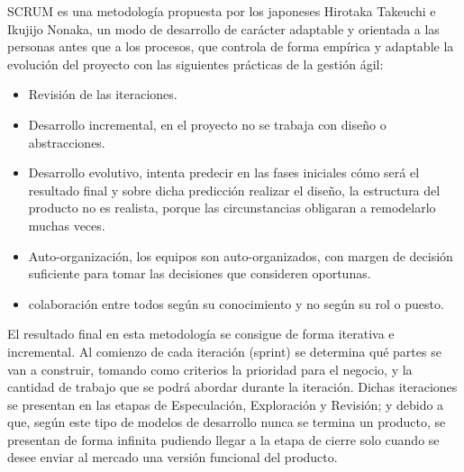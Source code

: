 SCRUM es una metodología propuesta por los japoneses Hirotaka Takeuchi e Ikujijo Nonaka, un modo de desarrollo de carácter adaptable y orientada a las personas antes
que a los procesos, que controla de forma empírica y adaptable la evolución del proyecto con las siguientes prácticas de la gestión ágil:

\begin{itemize}
 \item Revisión de las iteraciones.
 \item Desarrollo incremental, en el proyecto no se trabaja con diseño o abstracciones.
 \item Desarrollo evolutivo, intenta predecir en las fases iniciales cómo será el resultado final y sobre dicha predicción realizar el diseño, la estructura del producto no es realista, porque las circunstancias obligaran a remodelarlo muchas veces.
 \item Auto-organización, los equipos son auto-organizados, con margen de decisión suficiente para tomar las decisiones que consideren oportunas.
 \item colaboración entre todos según su conocimiento y no según su rol o puesto.

\end{itemize}

El resultado final en esta metodología se consigue de forma iterativa e incremental. Al comienzo de cada iteración (sprint) se determina qué partes se van a construir, tomando como criterios la prioridad para el negocio, y la cantidad de trabajo que se podrá abordar durante la iteración. Dichas iteraciones se presentan en las etapas de Especulación, Exploración y Revisión; y debido a que, según este tipo de modelos de desarrollo nunca se termina un producto, se presentan de forma infinita pudiendo llegar a la etapa de cierre solo cuando se desee enviar al mercado una versión funcional del producto.\\

